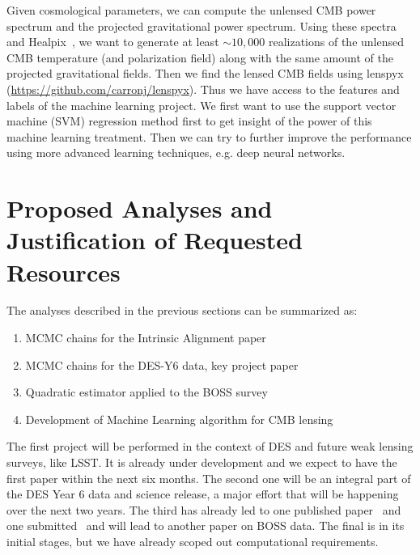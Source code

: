 \documentclass[12pt]{article}
\begin{document}
\begin{small}
Given cosmological parameters, we can compute the unlensed CMB power spectrum and the projected gravitational power spectrum. Using these spectra and Healpix~\cite{Gorski:2004by}, we want to generate at least $\sim 10,000$ realizations of the unlensed CMB temperature (and polarization field) along with the same amount of the projected gravitational fields. Then we find the lensed CMB fields using lenspyx (\url{https://github.com/carronj/lenspyx}). Thus we have access to the features and labels of the machine learning project. We first want to use the support vector machine (SVM) regression method first to get insight of the power of this machine learning treatment. Then we can try to further improve the performance using more advanced learning techniques, e.g. deep neural networks.

\section{Proposed Analyses and Justification of Requested Resources}

The analyses described in the previous sections can be summarized as:
\begin{enumerate}
\item MCMC chains for the Intrinsic Alignment paper
\item MCMC chains for the DES-Y6 data, key project paper
\item Quadratic estimator applied to the BOSS survey
\item Development of Machine Learning algorithm for CMB lensing
\end{enumerate}
The first project will be performed in the context of DES and future weak lensing surveys, like LSST. It is already under development and we expect to have the first paper within the next six months. The second one will be an integral part of the DES Year 6 data and science release, a major effort that will be happening over the next two years. The third has already led to one published paper~\cite{Li:2020uug} and one submitted~\cite{Li:2020luq} and will lead to another paper on BOSS data.
The final is in its initial stages, but we have already scoped out computational requirements.



\end{small}
\end{document}
